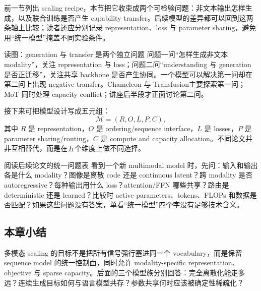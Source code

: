 前一节列出 scaling recipe，本节把它收束成两个可检验问题：非文本输出怎样生成，以及联合训练是否产生 capability transfer。后续模型的差异都可以回到这两条轴上比较；读者还应分别记录 representation、loss 与 parameter sharing，避免用“统一模型”掩盖不同实验条件。


\begin{knowledgebox}{读图：generation 与 transfer 是两个独立问题}
问题一问“怎样生成非文本 modality”，关注 representation 与 loss；问题二问“understanding 与 generation 是否正迁移”，关注共享 backbone 是否产生协同。一个模型可以解决第一问却在第二问上出现 negative transfer。Chameleon 与 Transfusion主要探索第一问；MoT 同时处理 capacity conflict；讲座后半段才正面讨论第二问。
\end{knowledgebox}

接下来可把模型设计写成五元组：
$$
\mathcal{M}=(R, O, L, P, C),
$$
其中 $R$ 是 representation，$O$ 是 ordering/sequence interface，$L$ 是 losses，$P$ 是 parameter sharing/routing，$C$ 是 compute and capacity allocation。不同论文并非互相替代，而是在五个维度上做不同选择。

\begin{knowledgebox}{阅读后续论文的统一问题表}
看到一个新 multimodal model 时，先问：输入和输出各是什么 modality？图像是离散 code 还是 continuous latent？跨 modality 是否 autoregressive？每种输出用什么 loss？attention/FFN 哪些共享？路由是 deterministic 还是 learned？比较时 active parameters、tokens、FLOPs 和数据是否匹配？如果这些问题没有答案，单看“统一模型”四个字没有足够技术含义。
\end{knowledgebox}

\subsection{本章小结}

多模态 scaling 的目标不是把所有信号强行塞进同一个 vocabulary，而是保留 sequence model 的统一控制面，同时允许 modality-specific representation、objective 与 sparse capacity。后面的三个模型族分别回答：完全离散化能走多远？连续生成目标如何与语言模型共存？参数共享何时应该被确定性稀疏化？

